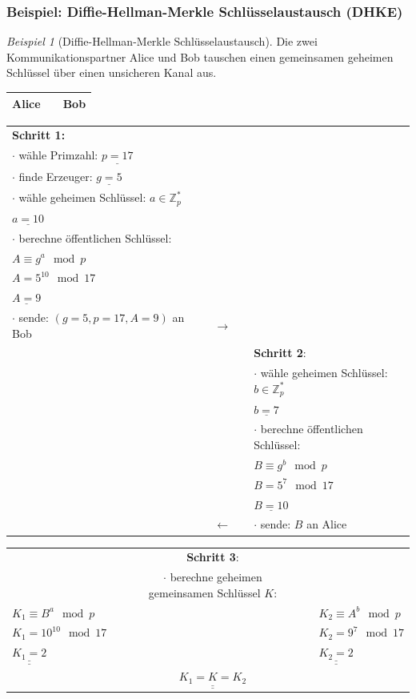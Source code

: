 \documentclass[
  a4paper,
  11pt,
]{scrartcl}
\theoremstyle{plain}
\theoremstyle{definition}
\theoremstyle{remark}
\newtheorem{beispiel}{Beispiel}
\newcommand{\Z}{\mathbb{Z}}
\def\doubleunderline#1{\underline{\underline{#1}}} %
\begin{document}
\subsubsection{Beispiel: Diffie-Hellman-Merkle Schlüsselaustausch (DHKE)}
\label{sub:dhke_beispiel}
\begin{beispiel}[Diffie-Hellman-Merkle Schlüsselaustausch]\label{bsp:dhke}
Die zwei Kommunikationspartner Alice und Bob tauschen einen gemeinsamen geheimen Schlüssel über einen unsicheren Kanal aus.
\begin{center}
    \begin{tabularx}{\textwidth}{lXr}
    	\textbf{Alice} & \text{ } & \textbf{Bob}\\\midrule
    \end{tabularx}
    \begin{tabularx}{\textwidth}{lXcXl}
    	\textbf{Schritt 1:} & & & & \\
    	$\cdot$ wähle Primzahl: $\underline{p = 17}$ & & & & \\
    	$\cdot$ finde Erzeuger: $\underline{g = 5}$ & & & & \\
    	$\cdot$ wähle geheimen Schlüssel: $a \in \Z_p^*$ & & & & \\
    	$\underline{a = 10}$ & & & & \\
    	$\cdot$ berechne öffentlichen Schlüssel: & & & & \\
    	$A \equiv g^a \mod p$ & & & & \\
    	$A = 5^{10} \mod 17$ & & & & \\
    	$\underline{A = 9}$ & & & & \\
    	$\cdot$ sende: $(g = 5, p = 17, A = 9)$ an Bob & & $\to$ & & \\\midrule
    	& & & & \textbf{Schritt 2}:\\
    	& & & & $\cdot$ wähle geheimen Schlüssel: $b \in \Z_p^*$\\
		& & & & $\underline{b=7}$\\
    	& & & & $\cdot$ berechne öffentlichen Schlüssel:\\
    	& & & & $B \equiv g^b \mod p$\\
    	& & & & $B = 5^7 \mod 17$\\
    	& & & & $\underline{B = 10}$\\
    	& & $\leftarrow$ & & $\cdot$ sende: $B$ an Alice\\\midrule
    \end{tabularx}
    \begin{tabularx}{\textwidth}{lXcXl}
    	& & \textbf{Schritt 3}: && \\
    	& & $\cdot$ berechne geheimen gemeinsamen Schlüssel $K$: & & \\
    	$K_1 \equiv B^a \mod p$ & & & & $K_2 \equiv A^b \mod p$\\
    	$K_1 = 10^{10} \mod 17$ & & & & $K_2 = 9^7 \mod 17$\\
    	$\doubleunderline{K_1 = 2}$ & & & & $\doubleunderline{K_2 = 2}$\\
    	& & $\doubleunderline{K_1 = K = K_2}$ & &
    \end{tabularx}
\end{center}
\end{beispiel}
\end{document}
